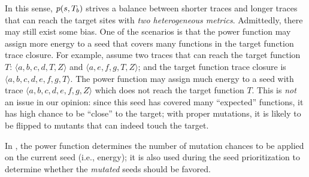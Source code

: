 In this sense, $p(s, T_b)$ strives a balance between shorter traces and longer traces that can reach the target sites with \emph{two heterogeneous metrics}. Admittedly, there may still exist some bias. One of the scenarios is that the power function may assign more energy to a seed that covers many functions in the target function trace closure. For example, assume two traces that can reach the target function $T$: $\langle a,b,c,d,T,Z\rangle$ and $\langle a,e,f,g,T,Z\rangle$; and the target function trace closure is $\langle a, b, c,d,e,f,g,T\rangle$. The power function may assign much energy to a seed with trace $\langle a, b, c, d, e, f, g, Z\rangle$ which does not reach the target function $T$. This is \emph{not} an issue in our opinion: since this seed has covered many ``expected'' functions, it has high chance to be ``close'' to the target; with proper mutations, it is likely to be flipped to mutants that can indeed touch the target.

In {\dFOT}, the power function determines the number of mutation chances to be applied on the current seed (i.e., energy); it is also used during the seed prioritization to determine whether the \emph{mutated} seeds should be favored.


